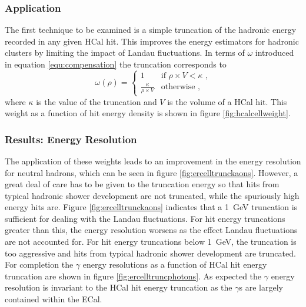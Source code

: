 \subsubsection{Application}
The first technique to be examined is a simple truncation of the hadronic energy recorded in any given HCal hit.  This improves the energy estimators for hadronic clusters by limiting the impact of Landau fluctuations.  In terms of $\omega$ introduced in equation \ref{equ:compensation} the truncation corresponds to
%
\begin{equation}
\omega(\rho) =
\begin{cases}
1 & \text{if } \rho \times V < \kappa \text{ ,} \\
\frac{\kappa}{\rho \times V} & \text{otherwise} \text{ ,}
\end{cases}
\end{equation}
%
\noindent where $\kappa$ is the value of the truncation and $V$ is the volume of a HCal hit.  This weight as a function of hit energy density is shown in figure \ref{fig:hcalcellweight}.  


\subsubsection{Results: Energy Resolution}
The application of these weights leads to an improvement in the energy resolution for neutral hadrons, which can be seen in figure \ref{fig:ercelltrunckaons}.  However, a great deal of care has to be given to the truncation energy so that hits from typical hadronic shower development are not truncated, while the spuriously high energy hits are.  Figure \ref{fig:ercelltrunckaons} indicates that a 1~GeV truncation is sufficient for dealing with the Landau fluctuations.  For hit energy truncations greater than this, the energy resolution worsens as the effect Landau fluctuations are not accounted for.  For hit energy truncations below 1~GeV, the truncation is too aggressive and hits from typical hadronic shower development are truncated.  For completion the $\gamma$ energy resolutions as a function of HCal hit energy truncation are shown in figure \ref{fig:ercelltruncphotons}.  As expected the $\gamma$ energy resolution is invariant to the HCal hit energy truncation as the $\gamma$s are largely contained within the ECal.

